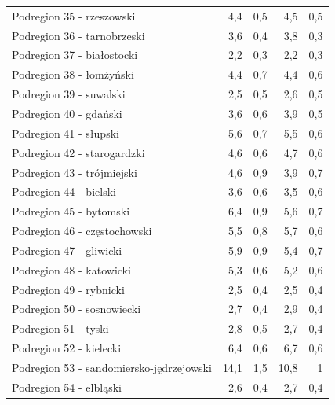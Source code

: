 \begin{center}
\begin{longtable}{p{6cm}rrrr}
Podregion 35 - rzeszowski                & 4,4     & 0,5         & 4,5      & 0,5          \\
Podregion 36 - tarnobrzeski              & 3,6     & 0,4         & 3,8      & 0,3          \\
Podregion 37 - białostocki               & 2,2     & 0,3         & 2,2      & 0,3          \\
Podregion 38 - łomżyński                 & 4,4     & 0,7         & 4,4      & 0,6          \\
Podregion 39 - suwalski                  & 2,5     & 0,5         & 2,6      & 0,5          \\
Podregion 40 - gdański                   & 3,6     & 0,6         & 3,9      & 0,5          \\
Podregion 41 - słupski                   & 5,6     & 0,7         & 5,5      & 0,6          \\
Podregion 42 - starogardzki              & 4,6     & 0,6         & 4,7      & 0,6          \\
Podregion 43 - trójmiejski               & 4,6     & 0,9         & 3,9      & 0,7          \\
Podregion 44 - bielski                   & 3,6     & 0,6         & 3,5      & 0,6          \\
Podregion 45 - bytomski                  & 6,4     & 0,9         & 5,6      & 0,7          \\
Podregion 46 - częstochowski             & 5,5     & 0,8         & 5,7      & 0,6          \\
Podregion 47 - gliwicki                  & 5,9     & 0,9         & 5,4      & 0,7          \\
Podregion 48 - katowicki                 & 5,3     & 0,6         & 5,2      & 0,6          \\
Podregion 49 - rybnicki                  & 2,5     & 0,4         & 2,5      & 0,4          \\
Podregion 50 - sosnowiecki               & 2,7     & 0,4         & 2,9      & 0,4          \\
Podregion 51 - tyski                     & 2,8     & 0,5         & 2,7      & 0,4          \\
Podregion 52 - kielecki                  & 6,4     & 0,6         & 6,7      & 0,6          \\
Podregion 53 - sandomiersko-jędrzejowski & 14,1    & 1,5         & 10,8     & 1            \\
Podregion 54 - elbląski                  & 2,6     & 0,4         & 2,7      & 0,4          \\

\end{longtable}
\end{center}
